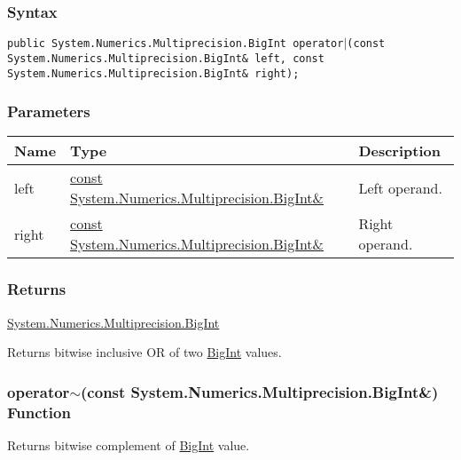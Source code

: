 \documentclass[a4paper,oneside,11.000000pt]{book}
\begin{document}
\subsubsection*{Syntax}
\texttt{public System.Numerics.Multiprecision.BigInt operator$|$(const System.Numerics.Multiprecision.BigInt\& left, const System.Numerics.Multiprecision.BigInt\& right);}
\subsubsection*{Parameters}
\begin{flushleft}
\begin{supertabular}[l]{!{\raggedright}p{1.30721cm}!{\raggedright}p{8.55945cm}!{\raggedright}p{3.66839cm}}
\textbf{Name}
& \textbf{Type}
& \textbf{Description}
\\
\hline
left
& \hyperlink{System.Numerics.Multiprecision.BigInt}{const System.\-Numerics.\-Multiprecision.\-BigInt\&\-}
& Left operand.

\\
right
& \hyperlink{System.Numerics.Multiprecision.BigInt}{const System.\-Numerics.\-Multiprecision.\-BigInt\&\-}
& Right operand.

\\
\end{supertabular}

\end{flushleft}
\subsubsection*{Returns}
\hyperlink{System.Numerics.Multiprecision.BigInt}{System.\-Numerics.\-Multiprecision.\-BigInt}
\begin{flushleft}
Returns bitwise inclusive OR of two \hyperlink{System.Numerics.Multiprecision.BigInt}{BigInt} values.

\end{flushleft}
\clearpage

\hypertarget{System.Numerics.Multiprecision.operator.complement.C.R.System.Numerics.Multiprecision.BigInt}{\subsubsection*{operator$\sim$(const System.Numerics.Multiprecision.BigInt\&) Function}}
\begin{flushleft}
Returns bitwise complement of \hyperlink{System.Numerics.Multiprecision.BigInt}{BigInt} value.

\end{flushleft}
\end{document}
